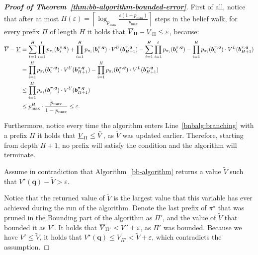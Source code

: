 \begin{proof}[\normalfont\bfseries Proof of Theorem~\ref{thm:bb-algorithm-bounded-error}]
    First of all, notice that after at most $H(\varepsilon) = \left\lceil \log_{p_{\max}} \frac{\varepsilon (1 - p_{\max})}{p_{\max}} \right\rceil$ steps in the belief walk, for every prefix $\Pi$ of length $H$ it holds that $\overline{V}_{\Pi} - \underline{V}_{\Pi} \leq \varepsilon$, because:
    \begin{align*}
        \overline{V} - \underline{V} &= \sum_{t=1}^{H} \prod_{i=1}^{t} p_{\pi_i}(\bm{b}^{\pi, \bm{q}}_i) + \prod_{i=1}^{H} p_{\pi_i}(\bm{b}^{\pi, \bm{q}}_{i}) \cdot V^{U}(\bm{b}^{\pi, \bm{q}}_{H+1}) - \sum_{t=1}^{H} \prod_{i=1}^{t} p_{\pi_i}(\bm{b}^{\pi, \bm{q}}_i) - \prod_{i=1}^{H} p_{\pi_i}(\bm{b}^{\pi, \bm{q}}_{i}) \cdot V^{L}(\bm{b}^{\pi, \bm{q}}_{H+1}) \\
        &= \prod_{i=1}^{H} p_{\pi_i}(\bm{b}^{\pi, \bm{q}}_{i}) \cdot V^{U}(\bm{b}^{\pi, \bm{q}}_{H+1}) - \prod_{i=1}^{H} p_{\pi_i}(\bm{b}^{\pi, \bm{q}}_{i}) \cdot V^{L}(\bm{b}^{\pi, \bm{q}}_{H+1}) \\
        &\leq \prod_{i=1}^{H} p_{\pi_i}(\bm{b}^{\pi, \bm{q}}_{i}) \cdot V^{U}(\bm{b}^{\pi, \bm{q}}_{H+1}) \\
        &\leq p_{\max}^H \cdot \frac{p_{\max}}{1-p_{\max}} \leq \varepsilon.
    \end{align*}

    Furthermore, notice every time the algorithm enters Line~\ref{bnbalg:branching} with a prefix $\Pi$ it holds that $\underline{V}_{\Pi} \leq \tilde V$, as $\tilde V$ was updated earlier. Therefore, starting from depth $H+1$, no prefix will satisfy the condition and the algorithm will terminate.
    
    Assume in contradiction that Algorithm~\ref{bb-algorithm} returns a value $\tilde V$ such that $V^{\star}(\bm{q}) - \tilde V > \varepsilon$.

    Notice that the returned value of $\tilde V$ is the largest value that this variable has ever achieved during the run of the algorithm. Denote the last prefix of $\pi^\star$ that was pruned in the Bounding part of the algorithm as $\Pi'$, and the value of $\tilde V$ that bounded it as $V'$. It holds that $\overline{V}_{\Pi'} < V' + \varepsilon$, as $\Pi'$ was bounded. Because we have $V' \leq \tilde V$, it holds that $V^{\star}(\bm{q}) \leq \overline{V_{\Pi'}} < \tilde V + \varepsilon$, which contradicts the assumption.
        
\end{proof}

